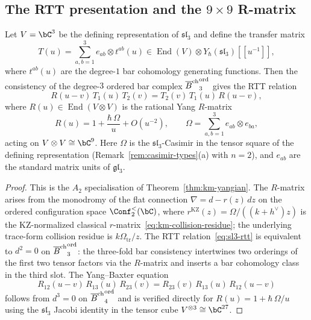 \subsection{The RTT presentation and the \texorpdfstring{$9\times 9$}{9x9} R-matrix}

\begin{theorem}
\label{thm:sl3-rtt}
Let $V=\bC^3$ be the defining representation of
$\mathfrak{sl}_3$ and define the transfer matrix
\[
T(u)
=\sum_{a,b=1}^{3}e_{ab}\otimes t^{ab}(u)
\in \operatorname{End}(V)\otimes Y_\hbar(\mathfrak{sl}_3)[\![u^{-1}]\!],
\]
where $t^{ab}(u)$ are the degree-$1$ bar cohomology generating
functions. Then the consistency of the degree-$3$ ordered bar complex
${\overline{B}^{\mathrm{ch}}}^{\mathrm{ord}}_3$ gives the RTT relation
\begin{equation}\label{eq:sl3-rtt}
R(u{-}v)\,T_1(u)\,T_2(v)
=T_2(v)\,T_1(u)\,R(u{-}v),
\end{equation}
where $R(u)\in\operatorname{End}(V\otimes V)$ is the rational
Yang $R$-matrix
\begin{equation}\label{eq:sl3-R-matrix}
R(u)=1+\frac{\hbar\,\Omega}{u}+O(u^{-2}),
\qquad
\Omega=\sum_{a,b=1}^{3}e_{ab}\otimes e_{ba},
\end{equation}
acting on $V\otimes V\cong\bC^9$. Here
$\Omega$ is the $\mathfrak{sl}_3$-Casimir in the tensor square of
the defining representation
\textup{(}Remark~\textup{\ref{rem:casimir-types}(a)} with $n=2$\textup{)},
and $e_{ab}$ are the standard matrix units of $\mathfrak{gl}_3$.
\end{theorem}

\begin{proof}
This is the $A_2$ specialisation of Theorem~\ref{thm:km-yangian}.
The $R$-matrix arises from the monodromy of the flat connection
$\nabla=d-r(z)\,dz$ on the ordered configuration space
$\Conf_2^<(\bC)$, where
$r^{\mathrm{KZ}}(z)=\Omega/((k+h^\vee)z)$ is the KZ-normalized
classical $r$-matrix~\eqref{eq:km-collision-residue}; the underlying
trace-form collision residue is $k\Omega_{\mathrm{tr}}/z$.
The RTT relation~\eqref{eq:sl3-rtt} is equivalent to $d^2=0$ on
${\overline{B}^{\mathrm{ch}}}^{\mathrm{ord}}_3$: the three-fold bar consistency
intertwines two orderings of the first two tensor factors via the
$R$-matrix and inserts a bar cohomology class in the third slot.
The Yang--Baxter equation
\[
R_{12}(u{-}v)\,R_{13}(u)\,R_{23}(v)
=R_{23}(v)\,R_{13}(u)\,R_{12}(u{-}v)
\]
follows from $d^3=0$ on ${\overline{B}^{\mathrm{ch}}}^{\mathrm{ord}}_4$ and is verified
directly for $R(u)=1+\hbar\,\Omega/u$ using the $\mathfrak{sl}_3$
Jacobi identity in the tensor cube $V^{\otimes 3}\cong\bC^{27}$.
\end{proof}

